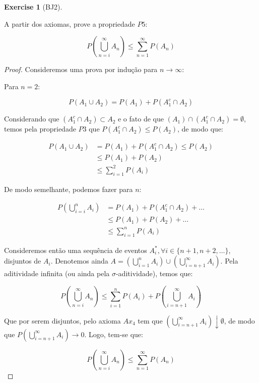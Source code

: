 \documentclass[
]{article}
\theoremstyle{definition}
\theoremstyle{definition}
\theoremstyle{definition}
\newtheorem{exercise}{Exercise}[section]
\theoremstyle{definition}
\theoremstyle{remark}
\begin{document}
\begin{exercise}[BJ2]
\protect\hypertarget{exr:exbj2}{}\label{exr:exbj2}

A partir dos axiomas, prove a propriedade \(P5\):

\[
P\left(\bigcup_{n=i}^{\infty}A_{n}\right) \le \sum_{n=1}^{\infty}P(A_{n})
\]

\begin{proof}
Consideremos uma prova por indução para \(n \to \infty\):

Para \(n=2\):

\[
P(A_{1} \cup A_{2}) = P(A_{1}) + P(A_{1}^{c} \cap A_{2})
\]

Considerando que \((A_1^{c} \cap A_{2}) \subset A_{2}\) e o fato de que \((A_{1}) \cap (A_{1}^{c} \cap A_{2}) = \emptyset\), temos pela propriedade \(P3\) que \(P(A_1^{c} \cap A_{2}) \le P(A_{2})\), de modo que:

\begin{align*}
P(A_{1} \cup A_{2}) &= P(A_{1}) + P(A_{1}^{c} \cap A_{2}) \le P(A_{2}) \\
&\le P(A_{1}) + P(A_{2})\\
&\le \sum_{i=1}^{2}P(A_{i})
\end{align*}

De modo semelhante, podemos fazer para \(n\):

\begin{align*}
P\left(\bigcup_{i=i}^{n}A_{i}\right) &= P(A_{1}) + P(A_{1}^{c} \cap A_{2}) + \dots \\
&\le P(A_{1}) + P(A_{2}) + \dots\\
&\le \sum_{i=1}^{n}P(A_{i})
\end{align*}

Consideremos então uma sequência de eventos \(A_{i}^{*},\forall i \in \{n+1,n+2,\dots\}\), disjuntos de \(A_{i}\). Denotemos ainda \(A = \left(\bigcup_{i = 1}^{n}A_{i}\right) \cup \left(\bigcup_{i=n+1}^{\infty}A_{i}\right)\). Pela aditividade infinita (ou ainda pela \(\sigma\)-aditividade), temos que:

\[
P\left(\bigcup_{n=i}^{\infty}A_{n}\right) \le \sum_{i=1}^{n}P(A_{i}) + P\left(\bigcup_{i=n+1}^{\infty}A_{i}\right)
\]

Que por serem disjuntos, pelo axioma \(Ax_{4}\) tem que \(\left(\bigcup_{i=n+1}^{\infty}A_{i}\right)\downarrow \emptyset\), de modo que \(P\left(\bigcup_{i=n+1}^{\infty}A_{i}\right) \to 0\). Logo, tem-se que:

\[
P\left(\bigcup_{n=i}^{\infty}A_{n}\right) \le \sum_{n=1}^{\infty}P(A_{n})
\]
\end{proof}

\end{exercise}
\end{document}
